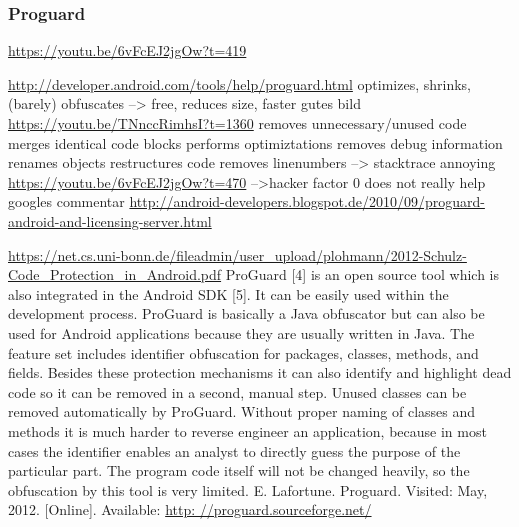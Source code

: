 \subsubsection{Proguard}\label{subsubsection:counter-reengineering-optobf-proguard}
\url{https://youtu.be/6vFcEJ2jgOw?t=419}\newline

\url{http://developer.android.com/tools/help/proguard.html}\newline
optimizes, shrinks, (barely) obfuscates --> free, reduces size, faster\newline
gutes bild \url{https://youtu.be/TNnccRimhsI?t=1360}\newline
removes unnecessary/unused code\newline
merges identical code blocks\newline
performs optimiztations\newline
removes debug information\newline
renames objects\newline
restructures code\newline
removes linenumbers --> stacktrace annoying\newline
\url{https://youtu.be/6vFcEJ2jgOw?t=470}\newline
-->hacker factor 0\newline
does not really help\newline
googles commentar \url{http://android-developers.blogspot.de/2010/09/proguard-android-and-licensing-server.html}

\url{https://net.cs.uni-bonn.de/fileadmin/user_upload/plohmann/2012-Schulz-Code_Protection_in_Android.pdf}
ProGuard [4] is an open source tool which is also integrated in the Android SDK [5]. It can
be easily used within the development process. ProGuard is basically a Java obfuscator
but can also be used for Android applications because they are usually written in Java.
The feature set includes identifier obfuscation for packages, classes, methods, and fields.
Besides these protection mechanisms it can also identify and highlight dead code so it can
be removed in a second, manual step. Unused classes can be removed automatically by
ProGuard.
Without proper naming of classes and methods it is much harder to reverse engineer
an application, because in most cases the identifier enables an analyst to directly guess
the purpose of the particular part. The program code itself will not be changed heavily,
so the obfuscation by this tool is very limited.\newline
E. Lafortune. Proguard. Visited: May, 2012. [Online]. Available: \url{http:
//proguard.sourceforge.net/}
